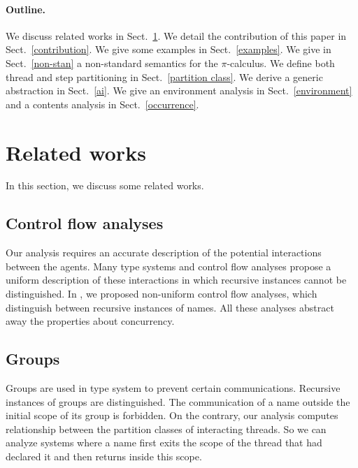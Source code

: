 \documentclass{article}
\newcommand{\picalcul}{$\pi$-calculus}
\begin{document}
\paragraph{Outline.}
We discuss related works in Sect.~\ref{related}.
We detail the contribution of this paper in Sect.~\ref{contribution}.
We give some examples in Sect.~\ref{examples}.
We give in Sect.~\ref{non-stan} a non-standard semantics for the \picalcul.
We define  both thread and step partitioning in Sect.~\ref{partition class}.
We derive a generic abstraction in Sect.~\ref{ai}.
We give an environment analysis in Sect.~\ref{environment}  
and a contents analysis in Sect.~\ref{occurrence}. 


\section{Related works}
\label{related}
In this section, we discuss some related works. 
\subsection{Control flow analyses} 
Our analysis requires an accurate description of the potential interactions between the agents. Many type systems \cite{hennessy.riely:resource-access} and control flow analyses \cite{nielson:journal,nielson:concur98} propose a uniform description of these interactions in which recursive instances cannot be distinguished. In \cite{feret:jlap,feret:sas2000,feret:esop2002}, we proposed non-uniform control flow analyses, which distinguish between recursive instances of names. 
All these analyses abstract away the properties about concurrency.
\subsection{Groups}
Groups \cite{cardelli00secrecy,cardelli00ambient} are used in type system to prevent certain communications.
Recursive instances of groups are distinguished. The communication of a name outside the initial scope of its group is forbidden. 
On the contrary, our analysis computes relationship between the partition classes of interacting threads. So we can analyze systems where a name first exits the scope of the thread that had declared it and then returns inside this scope.  
\end{document}
